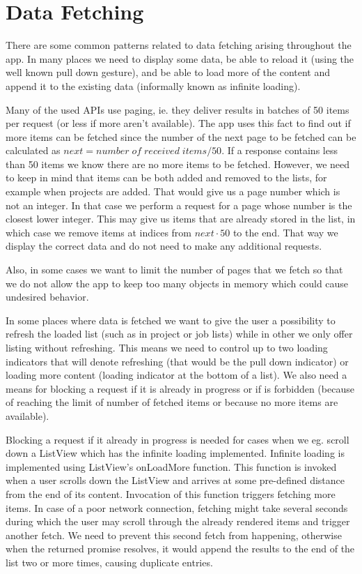 \section{Data Fetching}

There are some common patterns related to data fetching arising throughout the app. In many places we need to display some data, be able to reload it (using the well known pull down gesture), and be able to load more of the content and append it to the existing data (informally known as infinite loading).

Many of the used APIs use paging, ie. they deliver results in batches of 50 items per request (or less if more aren't available). The app uses this fact to find out if more items can be fetched since the number of the next page to be fetched can be calculated as $next = number \;of\; received \;items / 50$. If a response contains less than 50 items we know there are no more items to be fetched. However, we need to keep in mind that items can be both added and removed to the lists, for example when projects are added. That would give us a page number which is not an integer. In that case we perform a request for a page whose number is the closest lower integer. This may give us items that are already stored in the list, in which case we remove items at indices from $next \cdot 50$ to the end. That way we display the correct data and do not need to make any additional requests.

Also, in some cases we want to limit the number of pages that we fetch so that we do not allow the app to keep too many objects in memory which could cause undesired behavior. 

In some places where data is fetched we want to give the user a possibility to refresh the loaded list (such as in project or job lists) while in other we only offer listing without refreshing. This means we need to control up to two loading indicators that will denote refreshing (that would be the pull down indicator) or loading more content (loading indicator at the bottom of a list). We also need a means for blocking a request if it is already in progress or if is forbidden (because of reaching the limit of number of fetched items or because no more items are available). 

Blocking a request if it already in progress is needed for cases when we eg. scroll down a ListView which has the infinite loading implemented. Infinite loading is implemented using ListView’s onLoadMore function. This function is invoked when a user scrolls down the ListView and arrives at some pre-defined distance from the end of its content. Invocation of this function triggers fetching more items. In case of a poor network connection, fetching might take several seconds during which the user may scroll through the already rendered items and trigger another fetch. We need to prevent this second fetch from happening, otherwise when the returned promise resolves, it would append the results to the end of the list two or more times, causing duplicate entries.
 
